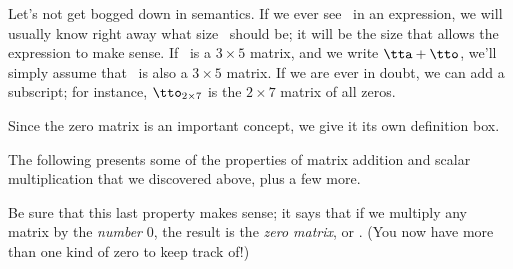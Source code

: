 Let's not get bogged down in semantics. If we ever see \tto\ in an expression, we will usually know right away what size \tto\ should be; it will be the size that allows the expression to make sense. If \tta\ is a $3\times 5$ matrix, and we write $\tta + \tto$, we'll simply assume that \tto\ is also a $3\times 5$ matrix. If we are ever in doubt, we can add a subscript; for instance, $\tto_{2\times 7}$ is the $2\times7$ matrix of all zeros.

Since the zero matrix is an important concept, we give it its own definition box.

\smallskip


\smallskip



The following presents some of the properties of matrix addition and scalar multiplication that we discovered above, plus a few more.

\smallskip


\smallskip

Be sure that this last property makes sense; it says that if we multiply any matrix by the \textit{number} 0, the result is the \textit{zero matrix}, or \tto. (You now have more than one kind of zero to keep track of!)


